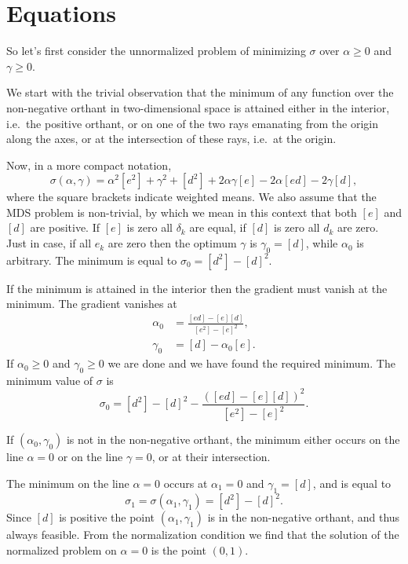 \documentclass[
  12pt,
]{article}
\begin{document}
\section{Equations}\label{equations}

So let's first consider the unnormalized problem of minimizing
\(\sigma\) over \(\alpha\geq 0\) and \(\gamma\geq 0\).

We start with the trivial observation that the minimum of any function
over the non-negative orthant in two-dimensional space is attained
either in the interior, i.e.~the positive orthant, or on one of the two
rays emanating from the origin along the axes, or at the intersection of
these rays, i.e.~at the origin.

Now, in a more compact notation,
\begin{equation}
\sigma(\alpha,\gamma)=\alpha^2[e^2]+\gamma^2+[d^2]+2\alpha\gamma[e]-2\alpha[ed]-2\gamma[d],
\end{equation}
where the square brackets indicate weighted means. We also assume that the MDS problem is
non-trivial, by which we mean in this context that both \([e]\) and \([d]\) are positive. If \([e]\) is zero all \(\delta_k\) are equal, if \([d]\) is zero all \(d_k\) are zero. Just in case, if all \(e_k\) are zero
then the optimum \(\gamma\) is \(\gamma_0=[d]\), while \(\alpha_0\) is arbitrary. The minimum is equal to
\(\sigma_0=[d^2]-[d]^2\).

If the minimum is attained in the interior then the gradient
must vanish at the minimum. The gradient vanishes at
\begin{align}
\alpha_0&=\frac{[ed]-[e][d]}{[e^2]-[e]^2},\\
\gamma_0&=[d]-\alpha_0[e].
\end{align}
If \(\alpha_0\geq 0\) and \(\gamma_0\geq 0\) we are done and
we have found the required minimum. The minimum
value of \(\sigma\) is
\begin{equation}
\sigma_0=[d^2]-[d]^2-\frac{([ed]-[e][d])^2}{[e^2]-[e]^2}.
\end{equation}

If \((\alpha_0,\gamma_0)\) is not in the non-negative orthant, the minimum
either occurs on the line \(\alpha=0\) or on the line \(\gamma=0\), or at
their intersection.

The minimum on the line \(\alpha=0\) occurs at \(\alpha_1=0\) and \(\gamma_1=[d]\), and is equal
to
\begin{equation}
\sigma_1=\sigma(\alpha_1,\gamma_1)=[d^2]-[d]^2.
\end{equation}
Since \([d]\) is positive the point \((\alpha_1,\gamma_1)\)
is in the non-negative orthant, and thus always feasible. From the normalization
condition we find that the solution of the normalized problem on
\(\alpha=0\) is the point \((0,1)\).
\end{document}
